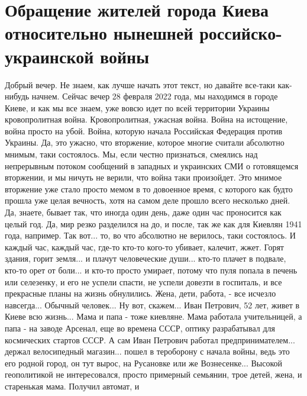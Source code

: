  
 
 
 
 

\section{Обращение жителей города Киева относительно нынешней российско-украинской войны}

Добрый вечер. Не знаем, как лучше начать этот текст, но давайте все-таки
как-нибудь начнем. Сейчас вечер 28 февраля 2022 года, мы находимся в городе
Киеве, и как мы все знаем, уже вовсю идет по всей территории Украины
кровопролитная война. Кровопролитная, ужасная война. Война на истощение, война
просто на убой. Война, которую начала Российская Федерация против Украины. Да,
это ужасно, что вторжение, которое многие считали абсолютно мнимым, таки
состоялось. Мы, если честно признаться, смеялись над непрерывным потоком
сообщений в западных и украинских СМИ о готовящемся вторжении, и мы ничуть не
верили, что война таки произойдет. Это мнимое вторжение уже стало просто мемом
в то довоенное время, с которого как будто прошла уже целая вечность, хотя на
самом деле прошло всего несколько дней. Да, знаете, бывает так, что иногда один
день, даже один час проносится как целый год. Да, мир резко разделился на до, и
после, так же как для Киевлян 1941 года, например. Так вот... то, во что
абсолютно не верилось, таки состоялось. И каждый час, каждый час, где-то кто-то
кого-то убивает, калечит, жжет. Горят здания, горит земля... и плачут
человеческие души...  кто-то плачет в подвале, кто-то орет от боли... и кто-то
просто умирает, потому что пуля попала в печень или селезенку, и его не успели
спасти, не успели довезти в госпиталь, и все прекрасные планы на жизнь
обнулились.  Жена, дети, работа, - все исчезло навсегда... Обычный человек...
Ну вот, скажем...  Иван Петрович, 52 лет, живет в Киеве всю жизнь... Мама и
папа - тоже киевляне.  Мама работала учительницей, а папа - на заводе Арсенал,
еще во времена СССР, оптику разрабатывал для космических стартов СССР.  А сам
Иван Петрович работал предпринимателем... держал велосипедный магазин... пошел
в тероборону с начала войны, ведь это его родной город, он тут вырос, на
Русановке или же Вознесенке... Высокой геополитикой не интересовался, просто
примерный семьянин, трое детей, жена, и старенькая мама.  Получил автомат, и

